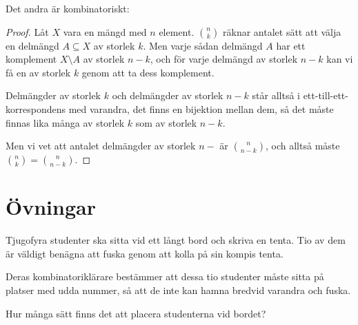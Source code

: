 \documentclass{tufte-handout}
\begin{document}
Det andra är kombinatoriskt:
\begin{proof}
	Låt $X$ vara en mängd med $n$ element. $\binom{n}{k}$ räknar antalet sätt att välja en delmängd $A \subseteq X$ av storlek $k$. Men varje sådan delmängd $A$ har ett komplement $X\setminus A$ av storlek $n-k$, och för varje delmängd av storlek $n-k$ kan vi få en av storlek $k$ genom att ta dess komplement.

	Delmängder av storlek $k$ och delmängder av storlek $n-k$ står alltså i ett-till-ett-korrespondens med varandra, det finns en bijektion mellan dem, så det måste finnas lika många av storlek $k$ som av storlek $n-k$.

	Men vi vet att antalet delmängder av storlek $n-$ är $\binom{n}{n-k}$, och alltså måste $\binom{n}{k} = \binom{n}{n-k}$.
\end{proof}




\section{Övningar}

\begin{xca}
	Tjugofyra studenter ska sitta vid ett långt bord och skriva en tenta. Tio av dem är väldigt benägna att fuska genom att kolla på sin kompis tenta.

	Deras kombinatoriklärare bestämmer att dessa tio studenter måste sitta på platser med udda nummer, så att de inte kan hamna bredvid varandra och fuska.

	Hur många sätt finns det att placera studenterna vid bordet?
\end{xca}
\end{document}
